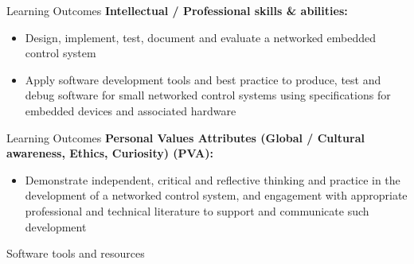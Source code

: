 \documentclass[xcolor=svgnames]{beamer}
\begin{document}
\begin{frame}{Learning Outcomes}
\textbf{Intellectual / Professional skills \& abilities:}
\begin{itemize}
    \item Design, implement, test, document and
    evaluate a networked embedded control
    system
    \item Apply software development tools and
    best practice to produce, test and
    debug software for small networked
    control systems using specifications for
    embedded devices and associated
    hardware
\end{itemize}

\end{frame}

\begin{frame}{Learning Outcomes}
\textbf{Personal Values Attributes (Global / Cultural
awareness, Ethics, Curiosity) (PVA):}
\begin{itemize}
    \item Demonstrate independent, critical and
    reflective thinking and practice in the
    development of a networked control
    system, and engagement with appropriate professional and technical
    literature to support and communicate
    such development
\end{itemize}
\end{frame}

\begin{frame}{Software tools and resources}

\end{frame}
\end{document}
